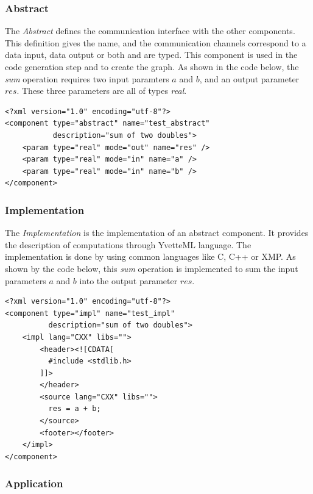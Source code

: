 \subsubsection{Abstract}

The \textit{Abstract} defines the communication interface with the other components. This definition gives the name, and the communication channels correspond to a data input, data output or both and are typed. This component is used in the code generation step and to create the graph. As shown in the code below, the \textit{sum} operation requires two input paramters $a$ and $b$, and an output parameter $res$. These three parameters are all of types \textit{real}. 

\lstset{language=XML}
\begin{lstlisting}[frame=single]
<?xml version="1.0" encoding="utf-8"?>
<component type="abstract" name="test_abstract"
           description="sum of two doubles">
    <param type="real" mode="out" name="res" />
    <param type="real" mode="in" name="a" />
    <param type="real" mode="in" name="b" />
</component>
\end{lstlisting}

\subsubsection{Implementation}

The \textit{Implementation} is the implementation of an abstract component. It provides the description of computations through YvetteML language. The implementation is done by using common languages like C, C++ or XMP. As shown by the code below,  this \textit{sum} operation is implemented to sum the input parameters $a$ and $b$ into the output parameter $res$.

\lstset{language=XML}
\begin{lstlisting}[frame=single]
<?xml version="1.0" encoding="utf-8"?>
<component type="impl" name="test_impl"
          description="sum of two doubles">
    <impl lang="CXX" libs="">
        <header><![CDATA[
          #include <stdlib.h>
        ]]>
        </header>
        <source lang="CXX" libs="">
          res = a + b;
        </source>
        <footer></footer>
    </impl>
</component>
\end{lstlisting}

\subsubsection{Application}

